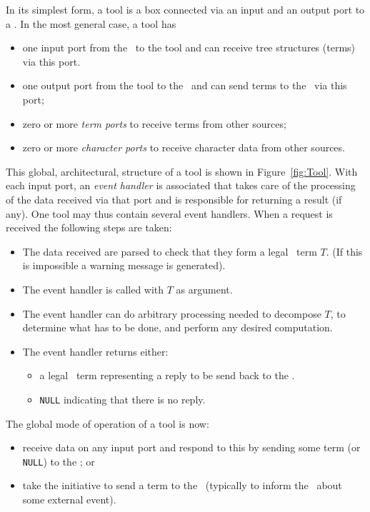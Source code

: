 In its simplest form, a tool is a box connected via an input and an output port to a \TB.
In the most general case, a tool has
\begin{itemize}

\item one input port from the \TB\ to the tool and
can receive tree structures (terms) via this port.

\item one output port from the tool to the \TB\ and
can  send terms to the \TB\ via this port;

\item zero or more {\em term ports} to receive terms from other sources;

\item zero or more {\em character ports} to receive character data
from other sources.
\end{itemize}

This global, architectural, structure of a tool is shown in Figure~\ref{fig:Tool}.
With each input port, an {\em event handler} is associated that takes care
of the processing of the data received via that port and is responsible
for returning a result (if any). One tool may thus contain several event handlers.
When a request is received the following steps
are taken:
\begin{itemize}
\item The data received are parsed to check that they form a legal \TB\ term $T$.
(If this is impossible a warning message is generated).
\item The event handler is called with $T$ as argument.
\item The event handler can do arbitrary processing needed to decompose
$T$, to determine what has to be done, and perform any desired computation.
\item The event handler returns either:
\begin{itemize}
\item a legal \TB\ term representing a reply to be send back to the \TB.
\item {\tt NULL} indicating that there is no reply.
\end{itemize}
\end{itemize}

The global mode of operation of a tool is now:
\begin{itemize}
\item receive data on any input port and respond to this
by sending some term (or {\tt NULL}) to the \TB; or
\item take the initiative to send a term to the \TB\ (typically to inform
the \TB\ about some external event).
\end{itemize}

